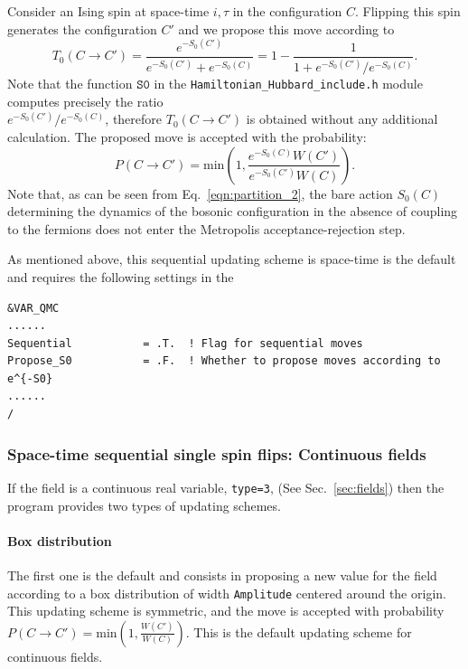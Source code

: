 Consider an Ising spin at space-time $i,\tau$ in the configuration $C$. Flipping this spin generates the configuration $C'$ and we propose this move according to 
\begin{equation}
T_0(C \rightarrow C')  =  \frac{e^{-S_0(C')}}{ e^{-S_0(C')} + e^{-S_0(C)} }   = 1 - \frac{1}{1 +  e^{-S_0(C')} /e^{-S_0(C)}}.
\end{equation}
Note that the function $\texttt{S0}$ in the  \texttt{Hamiltonian\_Hubbard\_include.h}  module  computes precisely the ratio\\
 ${e^{-S_0(C')} /e^{-S_0(C)}}$, therefore $T_0(C \rightarrow C') $ is obtained without any additional calculation. 
The proposed move is accepted with the probability: 
\begin{equation}
 P(C \rightarrow C') =  \text{min}  \left( 1,  \frac{e^{-S_0(C)}   W(C')}{ e^{-S_0(C')} W(C)} \right).
\end{equation}
Note that, as can be seen from Eq.~\eqref{eqn:partition_2}, the bare action $S_0(C)$  determining the  dynamics of the bosonic configuration in the absence of coupling to the fermions does not enter the Metropolis acceptance-rejection step.
% 
% 

As mentioned above,  this sequential updating scheme is space-time is the default and  requires the following settings in the 

\begin{lstlisting}[style=fortran,escapechar=\#,breaklines=true]
&VAR_QMC 
......
Sequential           = .T.  ! Flag for sequential moves
Propose_S0           = .F.  ! Whether to propose moves according to e^{-S0}
......
/
\end{lstlisting}

\subsubsection{Space-time sequential single spin flips: Continuous fields }
%
\label{sec:sequential_continuous}
If the  field is a continuous real variable,  \texttt{type=3}, (See Sec.~\ref{sec:fields}) then  the program  provides two  types of  updating schemes.

\paragraph{Box distribution} 
\label{sec:sequential_box}
The first one is the default and consists in proposing a new value for the field according to a box distribution of width \texttt{Amplitude} centered around the origin.  This updating scheme is symmetric, and the move is accepted with probability $P(C \rightarrow C') =  \text{min}  \left( 1, \frac{ W(C')}{W(C)} \right)$. This is the default updating scheme for continuous fields. 

